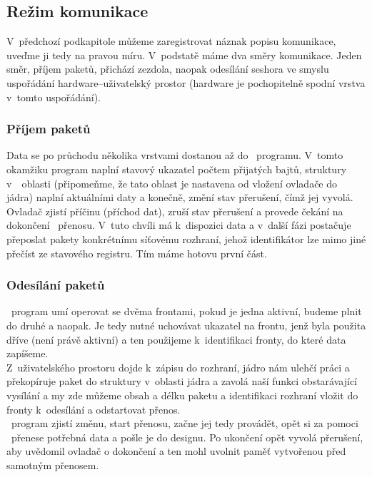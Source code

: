   \subsection{Režim komunikace}
  V~předchozí podkapitole můžeme zaregistrovat náznak popisu komunikace,
  uveďme ji tedy na pravou míru. V~podstatě máme dva směry komunikace.
  Jeden směr, příjem paketů, přichází zezdola,
  naopak odesílání seshora ve smyslu uspořádání hardware--uživatelský prostor
  (hardware je pochopitelně spodní vrstva v~tomto uspořádání).
  \subsubsection{Příjem paketů}
  Data se po průchodu několika vrstvami dostanou až do \ppc\ programu.
  V~tomto okamžiku program naplní stavový ukazatel počtem přijatých bajtů,
  struktury v~\dma\ oblasti (připomeňme, že tato oblast je nastavena od vložení
  ovladače do jádra) naplní aktuálními daty a konečně, změní stav přerušení,
  čímž jej vyvolá. Ovladač zjistí příčinu (příchod dat),
  zruší stav přerušení a provede čekání na dokončení \dma\ přenosu. V~tuto
  chvíli má k~dispozici data a v~další fázi postačuje přeposlat pakety
  konkrétnímu síťovému rozhraní, jehož identifikátor lze mimo jiné přečíst ze
  stavového registru. Tím máme hotovu první část.
  \subsubsection{Odesílání paketů}
  \ppc\ program umí
  operovat se dvěma frontami, pokud je jedna aktivní, budeme plnit do druhé a
  naopak. Je tedy nutné uchovávat ukazatel na frontu, jenž byla použita dříve
  (není právě aktivní) a ten použijeme k~identifikaci fronty, do které data
  zapíšeme. \\ \indent
  Z~uživatelského prostoru dojde k~zápisu do rozhraní, jádro nám ulehčí práci
  a překopíruje paket do struktury v~oblasti jádra a zavolá naší funkci
  obstarávající vysílání
  a my zde můžeme obsah a délku paketu a identifikaci rozhraní vložit do
  fronty k~odesílání a odstartovat přenos. \\ \indent
  \ppc\ program zjistí změnu, start přenosu, začne jej tedy provádět, opět
  si za pomoci \dma\ přenese potřebná data a pošle je do designu. Po ukončení
  opět vyvolá přerušení, aby uvědomil ovladač o dokončení a ten mohl uvolnit
  paměť vytvořenou před samotným přenosem.
